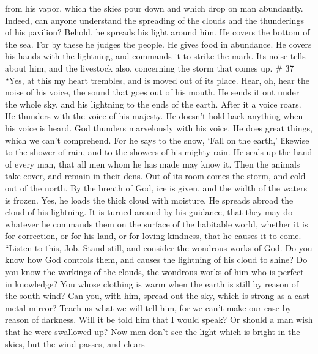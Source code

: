 from his vapor,  which the skies pour down and which drop
on man abundantly.  Indeed, can anyone understand the
spreading of the clouds and the thunderings of his pavilion?
 Behold, he spreads his light around him. He covers the
bottom of the sea.  For by these he judges the people. He
gives food in abundance.  He covers his hands with the
lightning, and commands it to strike the mark.  Its noise
tells about him, and the livestock also, concerning the storm that comes
up. \# 37  ``Yes, at this my heart trembles, and is moved
out of its place.  Hear, oh, hear the noise of his voice,
the sound that goes out of his mouth.  He sends it out under
the whole sky, and his lightning to the ends of the earth. 
After it a voice roars. He thunders with the voice of his majesty. He
doesn't hold back anything when his voice is heard.  God
thunders marvelously with his voice. He does great things, which we
can't comprehend.  For he says to the snow, `Fall on the
earth,' likewise to the shower of rain, and to the showers of his mighty
rain.  He seals up the hand of every man, that all men whom
he has made may know it.  Then the animals take cover, and
remain in their dens.  Out of its room comes the storm, and
cold out of the north.  By the breath of God, ice is given,
and the width of the waters is frozen.  Yes, he loads the
thick cloud with moisture. He spreads abroad the cloud of his lightning.
 It is turned around by his guidance, that they may do
whatever he commands them on the surface of the habitable world,
 whether it is for correction, or for his land, or for
loving kindness, that he causes it to come.  ``Listen to
this, Job. Stand still, and consider the wondrous works of God.
 Do you know how God controls them, and causes the
lightning of his cloud to shine?  Do you know the workings
of the clouds, the wondrous works of him who is perfect in knowledge?
 You whose clothing is warm when the earth is still by
reason of the south wind?  Can you, with him, spread out
the sky, which is strong as a cast metal mirror?  Teach us
what we will tell him, for we can't make our case by reason of darkness.
 Will it be told him that I would speak? Or should a man
wish that he were swallowed up?  Now men don't see the
light which is bright in the skies, but the wind passes, and clears
